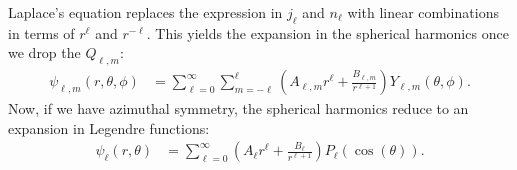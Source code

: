 \documentclass[10pt]{mypackage}
\begin{document}
  Laplace's equation replaces the expression in $j_{\ell}$ and $n_{\ell}$ with linear combinations in terms of $r^{\ell}$ and $r^{-\ell}$. This yields the expansion in the spherical harmonics once we drop the $Q_{\ell,m}$:
  \begin{align*}
    \psi_{\ell,m}\left( r,\theta,\phi \right) &= \sum_{\ell=0}^{\infty}\sum_{m=-\ell}^{\ell}\left( A_{\ell,m}r^{\ell} + \frac{B_{\ell,m}}{r^{\ell + 1}} \right) Y_{\ell,m}\left( \theta,\phi \right).
  \end{align*}
  Now, if we have azimuthal symmetry, the spherical harmonics reduce to an expansion in Legendre functions:
  \begin{align*}
    \psi_{\ell}\left( r,\theta \right) &= \sum_{\ell=0}^{\infty}\left( A_{\ell}r^{\ell} + \frac{B_{\ell}}{r^{\ell + 1}} \right)P_{\ell}\left( \cos\left( \theta \right) \right).
  \end{align*}
\end{document}

